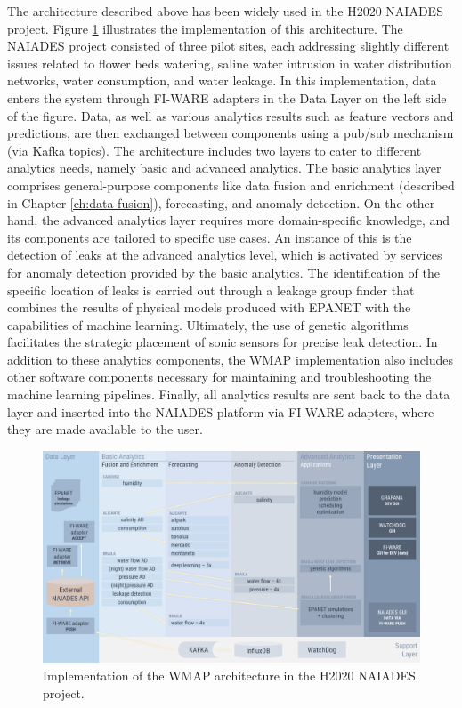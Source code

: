 The architecture described above has been widely used in the H2020 NAIADES project.
Figure \ref{fig:naiades_architecture} illustrates the implementation of this architecture.
The NAIADES project consisted of three pilot sites, each addressing slightly different issues related to flower beds watering, saline water intrusion in water distribution networks, water consumption, and water leakage. 
In this implementation, data enters the system through FI-WARE adapters in the Data Layer on the left side of the figure. 
Data, as well as various analytics results such as feature vectors and predictions, are then exchanged between components using a pub/sub mechanism (via Kafka topics). 
The architecture includes two layers to cater to different analytics needs, namely basic and advanced analytics. 
The basic analytics layer comprises general-purpose components like data fusion and enrichment (described in Chapter \ref{ch:data-fusion}), forecasting, and anomaly detection.
On the other hand, the advanced analytics layer requires more domain-specific knowledge, and its components are tailored to specific use cases.
An instance of this is the detection of leaks at the advanced analytics level, which is activated by services for anomaly detection provided by the basic analytics. 
The identification of the specific location of leaks is carried out through a leakage group finder that combines the results of physical models produced with EPANET with the capabilities of machine learning. 
Ultimately, the use of genetic algorithms facilitates the strategic placement of sonic sensors for precise leak detection.
In addition to these analytics components, the WMAP implementation also includes other software components necessary for maintaining and troubleshooting the machine learning pipelines. 
Finally, all analytics results are sent back to the data layer and inserted into the NAIADES platform via FI-WARE adapters, where they are made available to the user.

\begin{figure}[ht]
    \centering
    \includegraphics[width=15cm]{figures/architecture-naiades.pdf}
    \caption{Implementation of the WMAP architecture in the H2020 NAIADES project.}
    \label{fig:naiades_architecture}
\end{figure}

